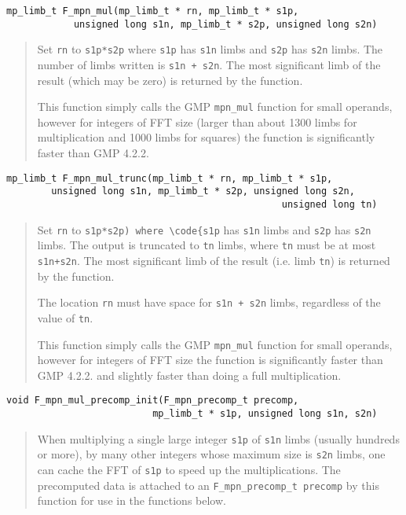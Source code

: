\documentclass[a4paper,10pt]{article}
\newcommand{\code}{\lstinline}
\begin{document}
\begin{lstlisting}
mp_limb_t F_mpn_mul(mp_limb_t * rn, mp_limb_t * s1p, 
            unsigned long s1n, mp_limb_t * s2p, unsigned long s2n)
\end{lstlisting}
\begin{quote}
Set \code{rn} to \code{s1p*s2p} where \code{s1p} has \code{s1n} limbs and \code{s2p} has \code{s2n} limbs. The number of limbs written is \code{s1n + s2n}. The most significant limb of the result (which may be zero) is returned by the function.

This function simply calls the GMP \code{mpn_mul} function for small operands, however for integers of FFT size (larger than about 1300 limbs for multiplication and 1000 limbs for squares) the function is significantly faster than GMP 4.2.2.
\end{quote}
                                      
\begin{lstlisting}
mp_limb_t F_mpn_mul_trunc(mp_limb_t * rn, mp_limb_t * s1p, 
        unsigned long s1n, mp_limb_t * s2p, unsigned long s2n, 
                                                 unsigned long tn)
\end{lstlisting}
\begin{quote}
Set \code{rn} to \code{s1p*s2p) where \code{s1p} has \code{s1n} limbs and \code{s2p} has \code{s2n} limbs. The output is truncated to \code{tn} limbs, where \code{tn} must be at most \code{s1n+s2n}. The most significant limb of the result (i.e. limb \code{tn}) is returned by the function.

The location \code{rn} must have space for \code{s1n + s2n} limbs, regardless of the value of \code{tn}.

This function simply calls the GMP \code{mpn_mul} function for small operands, however for integers of FFT size the function is significantly faster than GMP 4.2.2. and slightly faster than doing a full multiplication.
\end{quote}

\begin{lstlisting}
void F_mpn_mul_precomp_init(F_mpn_precomp_t precomp, 
                          mp_limb_t * s1p, unsigned long s1n, s2n)
\end{lstlisting}
\begin{quote}
When multiplying a single large integer \code{s1p} of \code{s1n} limbs (usually hundreds or more), by many other integers whose maximum size is \code{s2n} limbs, one can cache the FFT of \code{s1p} to speed up the multiplications. The precomputed data is attached to an \code{F_mpn_precomp_t precomp} by this function for use in the functions below.
\end{quote}
\end{document}
